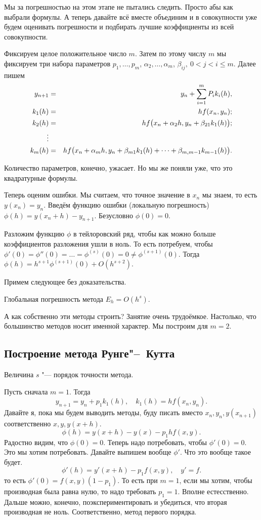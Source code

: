 Мы за погрешностью на этом этапе не пытались следить. Просто абы как выбрали формулы. А теперь давайте всё вместе объединим и в совокупности уже будем оценивать погрешности и подбирать лучшие коэффициенты из всей совокупности.

Фиксируем целое положительное число $m$. Затем по этому числу $m$ мы фиксируем три набора параметров $p_1,\dots,p_m$, $\alpha_2,\dots,\alpha_m$, $\beta_{ij},\ 0<j<i\le m$. Далее пишем
\begin{eqnarray*}
  y_{n+1} &=&  y_n + \sum\limits_{i = 1}^{m} P_i k_i(h),\\
  k_1(h) &=&  h f(x_n,y_n);\\
  k_2(h) &=&  h f\big(x_n+ \alpha_2 h, y_n + \beta_{21} k_1(h)\big);\\
  \vdots\\
  k_m(h) &=&  h f\big(x_n + \alpha_m h,y_n + \beta_{m1}k_1(h) + \dots + \beta_{m,m-1} k_{m-1}(h)\big).
\end{eqnarray*}

Количество параметров, конечно, ужасает. Но мы же поняли уже, что это квадратурные формулы.

Теперь оценим ошибки.
Мы считаем, что точное значение в $x_n$ мы знаем, то есть $y(x_n) = y_n$. Введём функцию ошибки (локальную погрешность) $\phi(h) = y(x_n+h) - y_{n+1}$. Безусловно $\phi(0) = 0$.

Разложим функцию $\phi$ в тейлоровский ряд, чтобы как можно больше коэффициентов разложения ушли в ноль. То есть потребуем, чтобы $\phi'(0) = \phi''(0) = \dots = \phi^{(s)}(0) = 0\ne\phi^{(s+1)}(0)$. Тогда $\phi(h) = h^{s+1} \phi^{(s+1)}(0) + O(h^{s+2})$.

Примем следующее без доказательства.
\begin{The}
Глобальная погрешность метода $E_h = O(h^s)$.
\end{The}

А как собственно эти методы строить? Занятие очень трудоёмкое. Настолько, что большинство методов носит именной характер. Мы построим для $m=2$.
\subsection{Построение метода Рунге"--~Кутта}
\begin{Def}
Величина $s$ "--- порядок точности метода.
\end{Def}
Пусть сначала $m=1$. Тогда
\[
  y_{n+1} = y_n + p_1 k_1(h),\quad k_1(h) = h f(x_n,y_n).
\]
Давайте я, пока мы будем выводить методы, буду писать вместо $x_n, y_n, y(x_{n+1})$ соответственно $x,y,y(x+h)$. 
\[
  \phi(h) = y(x+h) - y(x) - p_1 h f(x,y).
\]
Радостно видим, что $\phi(0) = 0$. Теперь надо потребовать, чтобы $\phi'(0) = 0$. Это мы хотим потребовать. Давайте выпишем вообще $\phi'$. Что это вообще такое будет.
\[
  \phi'(h) = y'(x+h) - p_1f(x,y),\quad y' = f.
\]
то есть $\phi'(0) = f(x,y)(1-p_1)$. То есть при $m=1$, если мы хотим, чтобы производная была равна нулю, то надо требовать $p_1=1$. Вполне естесственно. Дальше можно, конечно, поэкспериментировать  и убедиться, что вторая производная не ноль. Соответственно, метод первого порядка. 
